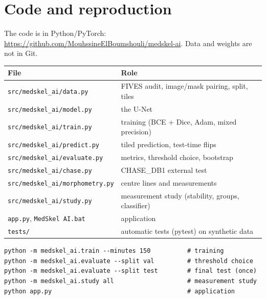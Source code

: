 \documentclass[11pt,a4paper]{article}
\begin{document}
\section{Code and reproduction}
The code is in Python/PyTorch: \url{https://github.com/MouhssineElBoumshouli/medskel-ai}. Data and weights are not in Git.
\begin{center}\small
\begin{tabularx}{\textwidth}{@{}lX@{}}
\toprule
\textbf{File} & \textbf{Role} \\
\midrule
\texttt{src/medskel\_ai/data.py} & FIVES audit, image/mask pairing, split, tiles \\
\texttt{src/medskel\_ai/model.py} & the U-Net \\
\texttt{src/medskel\_ai/train.py} & training (BCE + Dice, Adam, mixed precision) \\
\texttt{src/medskel\_ai/predict.py} & tiled prediction, test-time flips \\
\texttt{src/medskel\_ai/evaluate.py} & metrics, threshold choice, bootstrap \\
\texttt{src/medskel\_ai/chase.py} & CHASE\_DB1 external test \\
\texttt{src/medskel\_ai/morphometry.py} & centre lines and measurements \\
\texttt{src/medskel\_ai/study.py} & measurement study (stability, groups, classifier) \\
\texttt{app.py}, \texttt{MedSkel AI.bat} & application \\
\texttt{tests/} & automatic tests (pytest) on synthetic data \\
\bottomrule
\end{tabularx}
\end{center}
\begin{verbatim}
python -m medskel_ai.train --minutes 150          # training
python -m medskel_ai.evaluate --split val         # threshold choice
python -m medskel_ai.evaluate --split test        # final test (once)
python -m medskel_ai.study all                    # measurement study
python app.py                                     # application
\end{verbatim}
\end{document}
